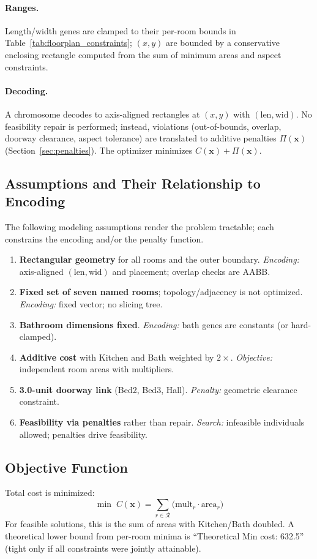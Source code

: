 \documentclass{article}
\begin{document}
\paragraph{Ranges.}
Length/width genes are clamped to their per-room bounds in Table~\ref{tab:floorplan_constraints}; $(x,y)$ are bounded by a conservative enclosing rectangle computed from the sum of minimum areas and aspect constraints.

\paragraph{Decoding.}
A chromosome decodes to axis-aligned rectangles at $(x,y)$ with $(\text{len},\text{wid})$. No feasibility repair is performed; instead, violations (out-of-bounds, overlap, doorway clearance, aspect tolerance) are translated to additive penalties $\Pi(\mathbf{x})$ (Section~\ref{sec:penalties}). The optimizer minimizes $C(\mathbf{x})+\Pi(\mathbf{x})$.

\subsection{Assumptions and Their Relationship to Encoding}
The following modeling assumptions render the problem tractable; each constrains the encoding and/or the penalty function.
\begin{enumerate}
    \item \textbf{Rectangular geometry} for all rooms and the outer boundary. \emph{Encoding:} axis-aligned $(\text{len},\text{wid})$ and placement; overlap checks are AABB.
    \item \textbf{Fixed set of seven named rooms}; topology/adjacency is not optimized. \emph{Encoding:} fixed vector; no slicing tree.
    \item \textbf{Bathroom dimensions fixed}. \emph{Encoding:} bath genes are constants (or hard-clamped).
    \item \textbf{Additive cost} with Kitchen and Bath weighted by $2\times$. \emph{Objective:} independent room areas with multipliers.
    \item \textbf{3.0-unit doorway link} (Bed2, Bed3, Hall). \emph{Penalty:} geometric clearance constraint.
    \item \textbf{Feasibility via penalties} rather than repair. \emph{Search:} infeasible individuals allowed; penalties drive feasibility.
\end{enumerate}

\subsection{Objective Function}
Total cost is minimized:
\[
\min\; C(\mathbf{x})=\sum_{r \in \mathcal{R}} \big(\text{mult}_r \cdot \text{area}_r \big)
\]
For feasible solutions, this is the sum of areas with Kitchen/Bath doubled. A theoretical lower bound from per-room minima is ``Theoretical Min cost: 632.5'' (tight only if all constraints were jointly attainable).
\end{document}
